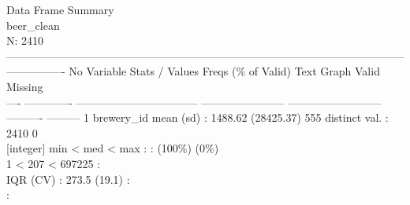 \documentclass[]{article}
\newenvironment{Shaded}{\begin{snugshade}}{\end{snugshade}}
\newcommand{\KeywordTok}[1]{\textcolor[rgb]{0.13,0.29,0.53}{\textbf{#1}}}
\newcommand{\DataTypeTok}[1]{\textcolor[rgb]{0.13,0.29,0.53}{#1}}
\newcommand{\StringTok}[1]{\textcolor[rgb]{0.31,0.60,0.02}{#1}}
\newcommand{\CommentTok}[1]{\textcolor[rgb]{0.56,0.35,0.01}{\textit{#1}}}
\newcommand{\OperatorTok}[1]{\textcolor[rgb]{0.81,0.36,0.00}{\textbf{#1}}}
\newcommand{\NormalTok}[1]{#1}
\begin{document}
\begin{Shaded}
\end{Shaded}

Data Frame Summary\\
beer\_clean\\
N: 2410\\
----------------------------------------------------------------------------------------------------------------------------
No Variable Stats / Values Freqs (\% of Valid) Text Graph Valid
Missing\\
---- ------------- ---------------------------------
----------------------- -------------------------- ---------- ---------
1 brewery\_id mean (sd) : 1488.62 (28425.37) 555 distinct val. : 2410
0\\
{[}integer{]} min \textless{} med \textless{} max : : (100\%) (0\%)\\
1 \textless{} 207 \textless{} 697225 :\\
IQR (CV) : 273.5 (19.1) :\\
:
\end{document}
